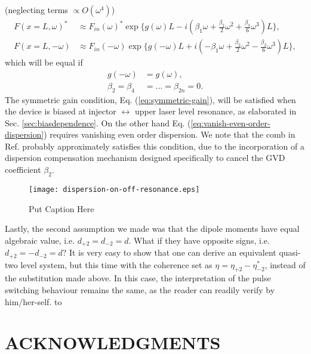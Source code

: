 \documentclass[]{spie}  %
\begin{document}
(neglecting terms $\propto O(\omega^4)$) \begin{subequations} \begin{align}
 	F(x=L,\omega)^* &\approx F_{in}(\omega)^* \exp\{g(\omega)L-i(\beta_1\omega +
 	\frac{\beta_2}{2}\omega^2 + \frac{\beta_3}{6}\omega^3 )L\}, \\ F(x=L,-\omega)
 	&\approx F_{in}(-\omega) \exp\{g(-\omega)L+i(-\beta_1\omega +
 	\frac{\beta_2}{2}\omega^2 - \frac{\beta_3}{6}\omega^3 )L\}, \end{align}
\end{subequations} which will be equal if \begin{subequations} \begin{align}
g(-\omega) &= g(\omega), \label{eq:symmetric-gain}\\ \beta_2 = \beta_4 &= ... =
\beta_{2n}=0. \label{eq:vanish-even-order-dispersion} \end{align}
\end{subequations} The symmetric gain condition, Eq. (\ref{eq:symmetric-gain}),
will be satisfied when the device is biased at injector $\leftrightarrow$ upper
laser level resonance, as elaborated in Sec. \ref{sec:biasdependence}. On the
other hand Eq. (\ref{eq:vanish-even-order-dispersion}) requires vanishing even
order dispersion. We note that the comb in Ref. \cite{burghoff2014terahertz}
probably approximately satisfies this condition, due to the incorporation of a
dispersion compensation mechanism designed specifically to cancel the GVD
coefficient $\beta_2$.

\begin{figure}[h!] \begin{center}
		\texttt{[image: dispersion-on-off-resonance.eps]} \caption{ Put
			Caption Here } \label{fig:dispersion-on-off-resonance} \end{center}
\end{figure}


Lastly, the second assumption we made was that the dipole moments have equal
algebraic value, i.e. $d_{+2} = d_{-2} = d$. What if they have opposite signs,
i.e. $d_{+2} = -d_{-2} = d$? It is very easy to show that one can derive an
equivalent quasi-two level system, but this time with the coherence set as
$\eta = \eta_{+2}-\eta_{-2}^*$, instead of the substitution made above. In this
case, the interpretation of the pulse switching behaviour remains the same, as
the reader can readily verify by him/her-self.  \acknowledgments %
to \section*{ACKNOWLEDGMENTS}       

 
\end{document}
